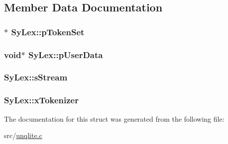 \subsection{Member Data Documentation}
\hypertarget{struct_sy_lex_a24d38ba9709d1426be3ee101bbab42a6}{
\subsubsection[{p\-Token\-Set}]{$\ast$ Sy\-Lex\-::p\-Token\-Set}}\label{d6/df8/struct_sy_lex_a24d38ba9709d1426be3ee101bbab42a6}
\hypertarget{struct_sy_lex_a0d80f24013812f065621076dc5f6b512}{
\subsubsection[{p\-User\-Data}]{\setlength{\rightskip}{0pt plus 5cm}void$\ast$ Sy\-Lex\-::p\-User\-Data}}\label{d6/df8/struct_sy_lex_a0d80f24013812f065621076dc5f6b512}
\hypertarget{struct_sy_lex_a1d2e068265daed97ed8963febdaef1da}{
\subsubsection[{s\-Stream}]{ Sy\-Lex\-::s\-Stream}}\label{d6/df8/struct_sy_lex_a1d2e068265daed97ed8963febdaef1da}
\hypertarget{struct_sy_lex_afa083e3c899daf68c19c2ac03a89b457}{
\subsubsection[{x\-Tokenizer}]{ Sy\-Lex\-::x\-Tokenizer}}\label{d6/df8/struct_sy_lex_afa083e3c899daf68c19c2ac03a89b457}


The documentation for this struct was generated from the following file\-:\begin{DoxyCompactItemize}
\item 
src/\hyperlink{unqlite_8c}{unqlite.\-c}\end{DoxyCompactItemize}
